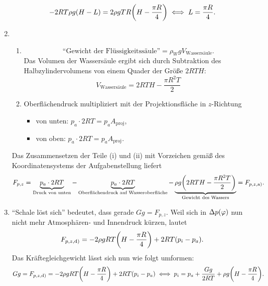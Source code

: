\documentclass{exercise}
\begin{document}
\begin{enumerate}
        \[
            -2RT\rho g\parentheses*{H - L} = 2\rho gTR\parentheses*{H - \frac{\pi R}{4}} \iff L = \frac{\pi R}{4}.
        \]
        \item
        \begin{enumerate}
            \item
            \[
                \text{``Gewicht der Flüssigkeitssäule''} = \rho_W gV_{\text{Wassersäule}}.
            \]
            Das Volumen der Wassersäule ergibt sich durch Subtraktion des Halbzylindervolumens von einem Quader der Größe \(2RTH\):
            \[
                V_{\text{Wassersäule}} = 2RTH - \frac{\pi R^2 T}{2}
            \]
            \item Oberflächendruck multipliziert mit der Projektionsfläche in \(z\)-Richtung
            \begin{itemize}
                \item von unten: \(p_a \cdot 2RT = p_a A_{\text{proj}}\),
                \item von oben: \(p_a \cdot 2RT = p_a A_{\text{proj}}\).
            \end{itemize}
        \end{enumerate}
        Das Zusammensetzen der Teile (i) und (ii) mit Vorzeichen gemäß des Koordinatensystems der Aufgabenstellung liefert
        \[
            F_{p, z} = \underbrace{p_a \cdot 2RT}_{\text{Druck von unten}} - \underbrace{p_a \cdot 2RT}_{\text{Oberflächendruck auf Wasseroberfläche}} - \underbrace{\rho g\parentheses*{2RTH - \frac{\pi R^2 T}{2}}}_{\text{Gewicht des Wassers}} = F_{p, z, \text{a)}}.
        \]
        \item ``Schale löst sich'' bedeutet, dass gerade \(Gg = F_{p, z}\).
        Weil sich in \(\Delta p\parentheses*{\varphi}\) nun nicht mehr Atmosphären- und Innendruck kürzen, lautet
        \[
            F_{p, z, \text{d)}} = -2\rho gRT\parentheses*{H - \frac{\pi R}{4}} + 2RT\parentheses*{p_i - p_a}.
        \]
        Das Kräftegleichgewicht lässt sich nun wie folgt umformen:
        \[
            Gg = F_{p, z, \text{d)}} = -2\rho gRT\parentheses*{H - \frac{\pi R}{4}} + 2RT\parentheses*{p_i - p_a} \iff p_i = p_a + \frac{Gg}{2RT} + \rho g\parentheses*{H - \frac{\pi R}{4}}.
        \]
    \end{enumerate}
\end{document}
